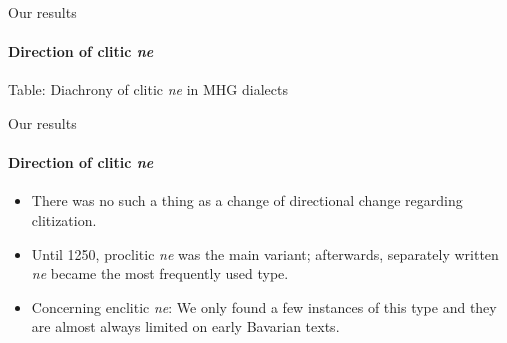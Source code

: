 \documentclass[xcolor=table, compress, %
handout
]{beamer}
\begin{document}
\begin{frame}{Our results}
\framesubtitle{Direction of clitic \textit{ne}}
\renewcommand{\arraystretch}{1.25}
\begin{center}
\end{center}

\begin{center}
Table: Diachrony of clitic \textit{ne} in MHG dialects
\end{center}

\end{frame}

\begin{frame}{Our results}
\framesubtitle{Direction of clitic \textit{ne}}

\begin{itemize}
    \item There was no such a thing as a change of directional change regarding clitization.
    \item Until 1250, proclitic \textit{ne} was the main variant; afterwards, separately written \textit{ne} became the most frequently used type.
    \item Concerning enclitic \textit{ne}: We only found a few instances of this type and they are almost always limited on early Bavarian texts.
\end{itemize}

\end{frame}
\end{document}
